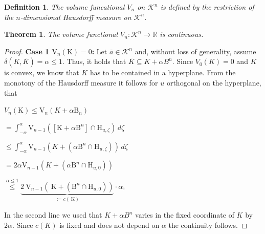 \documentclass[a4paper]{book}
\newtheorem{theorem}{Theorem}%
\newtheorem{definition}{Definition}%
\begin{document}
\begin{definition}
	The volume funcational $V_{n}$ on $\mathscr{K}^{n}$ is defined by the restriction of the $n$-dimensional Hausdorff measure on $\mathscr{K}^{n}$.
\end{definition}

\begin{theorem}
	The volume functional $V_{n}:\mathscr{K}^{n}\to\mathbb{R}$ is continuous.
\end{theorem}
\begin{proof}
    \textbf{Case 1 $\mathrm{V}_{n}(\mathrm{K})=0$:}
    Let $\overline{a}\in\mathscr{K}^{n}$ and, without loss of generality, assume $\delta(K,\overline{K})=\alpha\leq1$. Thus, it holds that $\overline{K}\subseteq K+\alpha B^{n}$. Since $V_{0}(K)=0$ and $K$ is convex, we know that $K$ has to be contained in a hyperplane. From the monotony of the Hausdorff measure it follows for $u$ orthogonal on the hyperplane, that
    \begin{center}
        $V_{n}(\mathrm{K})\leq \mathrm{V}_{n}(K+\alpha \mathrm{B}_{n})$

        $=\int_{-\alpha}^{\alpha}\mathrm{V}_{n-1}([\mathrm{K}+\alpha \mathrm{B}^{n}]\cap\mathrm{H}_{u,\zeta})\,d\zeta$

        $\leq\int_{-\alpha}^{\alpha}\mathrm{V}_{n-1}(K+(\alpha\mathrm{B}^{n}\cap\mathrm{H}_{u,\zeta}))\,d\zeta$

        $=2\alpha \mathrm{V}_{n-1}(K+(\alpha\mathrm{B}^{n}\cap\mathrm{H}_{u,0}))$

        $\overset{\alpha\leq1}{\leq}\underbrace{2\mathrm{~V}_{n-1}\left(\mathrm{~K}+\left(\mathrm{B}^n\cap \mathrm{H}_{u, 0}\right)\right)}_{:=c(\mathrm{~K})}\cdot\alpha$,
    \end{center}
    In the second line we used that $K+\alpha B^{n}$ varies in the fixed coordinate of $K$ by $2\alpha$. Since $c(K)$ is fixed and does not depend on $\alpha$ the continuity follows.


\end{proof}
\end{document}
